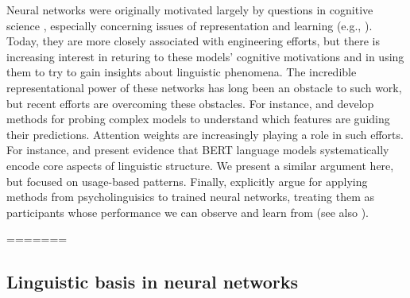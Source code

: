 \documentclass[11pt,a4paper]{article}
\newcommand{\ek}[1]{\textcolor{Orange}{[ek: #1]}}
\begin{document}
Neural networks were originally motivated largely by questions in cognitive science \citep{pater2019generative}, especially concerning issues of representation and learning (e.g., \citep{rumelhart1986learning,tesar2000learnability}). Today, they are more closely associated with engineering efforts, but there is increasing interest in returing to these models' cognitive motivations and in using them to try to gain insights about linguistic phenomena. The incredible representational power of these networks has long been an obstacle to such work, but recent efforts are overcoming these obstacles. For instance, \citet{N16-3020} and \citet{Koh:Liang:2017} develop methods for probing complex models to understand which features are guiding their predictions. Attention weights are increasingly playing a role in such efforts. For instance, \citet{jawahar-etal-2019-bert} and \citet{tenney-etal-2019-bert} present evidence that BERT language models systematically encode core aspects of linguistic structure. We present a similar argument here, but focused on usage-based patterns. Finally, \citet{linzen-etal-2016-assessing} explicitly argue for applying methods from psycholinguisics to trained neural networks, treating them as participants whose performance we can observe and learn from (see also \citealt{gulordava-etal-2018-colorless,Futrell-etal:2019}).



=======
\subsection{Linguistic basis in neural networks}
\end{document}
